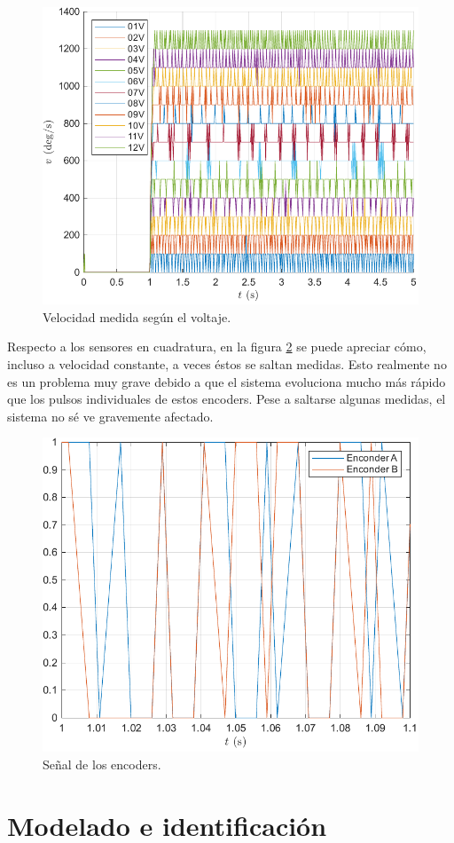 \documentclass{article}
\begin{document}
\begin{figure}[H]
    \centering
    \includegraphics[width=0.75\linewidth]{img/velocidadLazoAbierto.pdf}
    \caption{Velocidad medida según el voltaje.}
    \label{fig:velocidadLazoAbierto}
\end{figure}

Respecto a los sensores en cuadratura, en la figura \ref{fig:encodersCheck} se puede apreciar cómo, incluso a velocidad constante, a veces éstos se saltan medidas. Esto realmente no es un problema muy grave debido a que el sistema evoluciona mucho más rápido que los pulsos individuales de estos encoders. Pese a saltarse algunas medidas, el sistema no sé ve gravemente afectado.

\begin{figure}[H]
    \centering
    \includegraphics[width=0.75\linewidth]{img/encodersCheck.pdf}
    \caption{Señal de los encoders.}
    \label{fig:encodersCheck}
\end{figure}


\section{Modelado e identificación}
\end{document}
